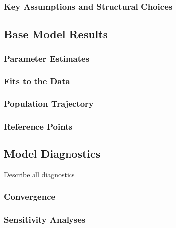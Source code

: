 \documentclass[11pt,
  letterpaper,
]{article}
\begin{document}
\hypertarget{key-assumptions-and-structural-choices}{%
\subsubsection{Key Assumptions and Structural Choices}\label{key-assumptions-and-structural-choices}}

\hypertarget{base-model-results}{%
\subsection{Base Model Results}\label{base-model-results}}

\hypertarget{parameter-estimates}{%
\subsubsection{Parameter Estimates}\label{parameter-estimates}}

\hypertarget{fits-to-the-data}{%
\subsubsection{Fits to the Data}\label{fits-to-the-data}}

\hypertarget{population-trajectory}{%
\subsubsection{Population Trajectory}\label{population-trajectory}}

\hypertarget{reference-points-1}{%
\subsubsection{Reference Points}\label{reference-points-1}}

\hypertarget{model-diagnostics}{%
\subsection{Model Diagnostics}\label{model-diagnostics}}

Describe all diagnostics

\hypertarget{convergence}{%
\subsubsection{Convergence}\label{convergence}}

\hypertarget{sensitivity-analyses}{%
\subsubsection{Sensitivity Analyses}\label{sensitivity-analyses}}
\end{document}
